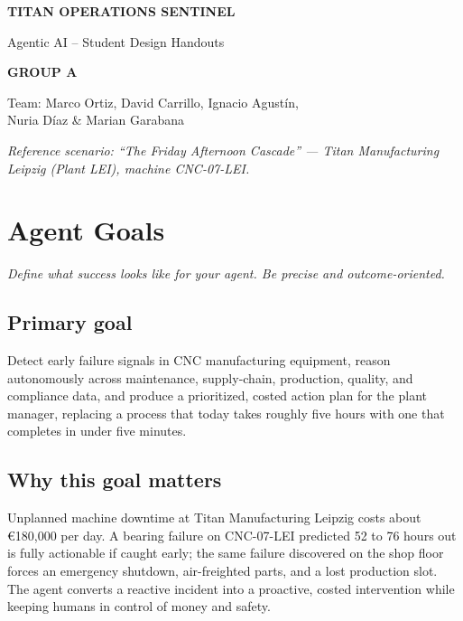 \documentclass[11pt,a4paper]{article}
\let\oldsection\section
\renewcommand{\section}{\needspace{7\baselineskip}\oldsection}
\let\oldsubsection\subsection
\renewcommand{\subsection}{\needspace{5\baselineskip}\oldsubsection}
\begin{document}
\begin{titlepage}
\centering
\vspace*{3cm}
{\color{titan}\sffamily\Huge\bfseries TITAN OPERATIONS SENTINEL\par}
\vspace{0.8cm}
{\color{titanlt}\sffamily\LARGE Agentic AI -- Student Design Handouts\par}
\vspace{1.4cm}
{\sffamily\Large\bfseries GROUP A\par}
\vspace{1.2cm}
{\large Team: Marco Ortiz, David Carrillo, Ignacio Agust\'in,\\[2pt] Nuria D\'iaz \& Marian Garabana\par}
\vfill
{\small\itshape Reference scenario: ``The Friday Afternoon Cascade'' --- Titan Manufacturing Leipzig (Plant LEI), machine CNC-07-LEI.\par}
\vspace{1cm}
\end{titlepage}

\section{Agent Goals}
\emph{Define what success looks like for your agent. Be precise and outcome-oriented.}

\subsection*{Primary goal}
Detect early failure signals in CNC manufacturing equipment, reason autonomously across maintenance, supply-chain, production, quality, and compliance data, and produce a prioritized, costed action plan for the plant manager, replacing a process that today takes roughly five hours with one that completes in under five minutes.

\subsection*{Why this goal matters}
Unplanned machine downtime at Titan Manufacturing Leipzig costs about \euro{}180{,}000 per day. A bearing failure on CNC-07-LEI predicted 52 to 76 hours out is fully actionable if caught early; the same failure discovered on the shop floor forces an emergency shutdown, air-freighted parts, and a lost production slot. The agent converts a reactive incident into a proactive, costed intervention while keeping humans in control of money and safety.
\end{document}
